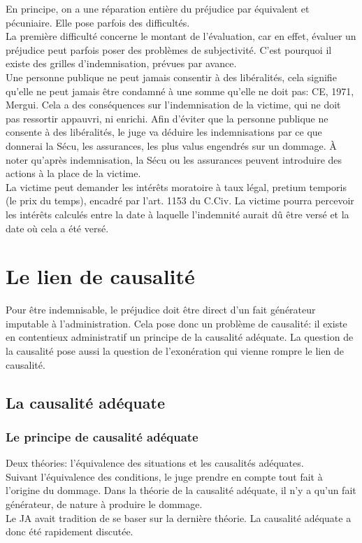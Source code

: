 \documentclass[10pt, a4paper, openany]{book}
\begin{document}
En principe, on a une réparation entière du préjudice par équivalent et pécuniaire. Elle pose parfois des difficultés. \\
La première difficulté concerne le montant de l'évaluation, car en effet, évaluer un préjudice peut parfois poser des problèmes de subjectivité. C'est pourquoi il existe des grilles d'indemnisation, prévues par avance. \\
Une personne publique ne peut jamais consentir à des libéralités, cela signifie qu'elle ne peut jamais être condamné à une somme qu'elle ne doit pas: CE, 1971, Mergui. Cela a des conséquences sur l'indemnisation de la victime, qui ne doit pas ressortir appauvri, ni enrichi. Afin d'éviter que la personne publique ne consente à des libéralités, le juge va déduire les indemnisations par ce que donnerai la Sécu, les assurances, les plus valus engendrés sur un dommage. À noter qu'après indemnisation, la Sécu ou les assurances peuvent introduire des actions à la place de la victime. \\
La victime peut demander les intérêts moratoire à taux légal, pretium temporis (le prix du temps), encadré par l'art. 1153 du C.Civ. La victime pourra percevoir les intérêts calculés entre la date à laquelle l'indemnité aurait dû être versé et la date où cela a été versé. 

\section{Le lien de causalité}

Pour être indemnisable, le préjudice doit être direct d'un fait générateur imputable à l'administration. Cela pose donc un problème de causalité: il existe en contentieux administratif un principe de la causalité adéquate. La question de la causalité pose aussi la question de l'exonération qui vienne rompre le lien de causalité.  

\subsection{La causalité adéquate}

\subsubsection{Le principe de causalité adéquate}

Deux théories: l'équivalence des situations et les causalités adéquates. \\
Suivant l'équivalence des conditions, le juge prendre en compte tout fait à l'origine du dommage. Dans la théorie de la causalité adéquate, il n'y a qu'un fait générateur, de nature à produire le dommage. \\
Le JA avait tradition de se baser sur la dernière théorie. La causalité adéquate a donc été rapidement discutée.
\end{document}
